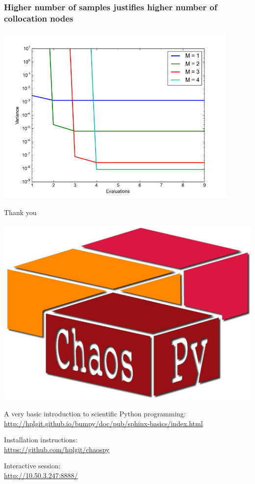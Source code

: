 \documentclass{beamer}
\begin{document}
\begin{frame}
 \frametitle{Higher number of samples justifies higher number of
 collocation nodes}
\includegraphics[width=0.9\textwidth]{k_convergence.png}
 \end{frame}

 
 
\begin{frame}[fragile]{Thank you}
  \begin{center}
     \includegraphics[width=.5\textwidth]{chaospy_logo.jpg}
  \end{center}
    \begin{alert}{A very basic introduction to scientific Python programming:}
    \scriptsize
      \href{http://hplgit.github.io/bumpy/doc/pub/sphinx-basics/index.html}{http://hplgit.github.io/bumpy/doc/pub/sphinx-basics/index.html}\\
  \end{alert}
  \begin{alert}{Installation instructions:}\\
  \scriptsize
      \href{https://github.com/hplgit/chaospy}{https://github.com/hplgit/chaospy}\\
  \end{alert}
    \begin{alert}{Interactive session:}\\
  \scriptsize
\href{http://10.50.3.247:8888/}{http://10.50.3.247:8888/}

  \end{alert}
\end{frame}
 


\end{document}

